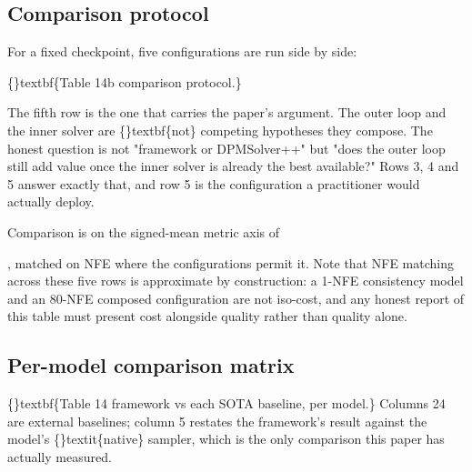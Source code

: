 \documentclass{article}
\begin{document}
\subsection{Comparison protocol}
For a fixed checkpoint, five configurations are run side by side:

\{\}textbf\{Table 14b  comparison protocol.\}

\begin{table}[ht]
\centering
\small
{}%
\end{table}

The fifth row is the one that carries the paper's argument. The outer loop and the inner solver are \{\}textbf\{not\} competing hypotheses  they compose. The honest question is not "framework or DPMSolver++" but "does the outer loop still add value once the inner solver is already the best available?" Rows 3, 4 and 5 answer exactly that, and row 5 is the configuration a practitioner would actually deploy.

Comparison is on the signed-mean metric axis of

, matched on NFE where the configurations permit it. Note that NFE matching across these five rows is approximate by construction: a 1-NFE consistency model and an 80-NFE composed configuration are not iso-cost, and any honest report of this table must present cost alongside quality rather than quality alone.

\subsection{Per-model comparison matrix}
\{\}textbf\{Table 14  framework vs each SOTA baseline, per model.\} Columns 24 are external baselines; column 5 restates the framework's result against the model's \{\}textit\{native\} sampler, which is the only comparison this paper has actually measured.
\end{document}
